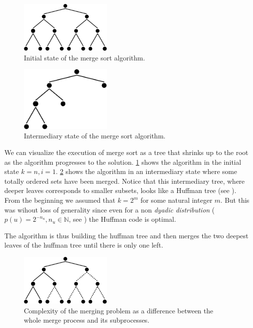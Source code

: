 \begin{figure}
	\centering
	\includegraphics[width=0.4\textwidth]{fig/merging/huffman-1-trim}
	\caption{Initial state of the merge sort algorithm.}
	\label{tree:merging:fig/huffman-1}
\end{figure}

\begin{figure}
	\centering
	\includegraphics[width=0.4\textwidth, bb= 0mm 0mm 131mm 74mm]{fig/merging/huffman-3-trim}
	\caption{Intermediary state of the merge sort algorithm.}
	\label{tree:merging:fig/huffman-3}
\end{figure}

We can visualize the execution of merge sort as a tree that shrinks up to the root as the algorithm progresses to the solution. \ref{tree:merging:fig/huffman-1} shows the algorithm in the initial state $k = n, i = 1$. \ref{tree:merging:fig/huffman-3} shows the algorithm in an intermediary state where some totally ordered sets have been merged. Notice that this intermediary tree, where deeper leaves corresponds to smaller subsets, looks like a Huffman tree (see \cite{huffman1952method}). From the beginning we assumed that $k = 2^m$ for some natural integer $m$. But this was wihout loss of generality since even for a non \emph{dyadic distribution} ($p(u) = 2^{-n_u}, n_u \in \mathbb{N}$, see \cite{cover2012elements}) the Huffman code is optimal.

The algorithm is thus building the huffman tree and then merges the two deepest leaves of the huffman tree until there is only one left.

\begin{figure}
	\centering
	\includegraphics[width=0.4\textwidth]{fig/merging/huffman-2-trim}
	\caption{Complexity of the merging problem as a difference between the whole merge process and its subprocesses.}
	\label{tree:merging:fig/huffman-2}
\end{figure}


